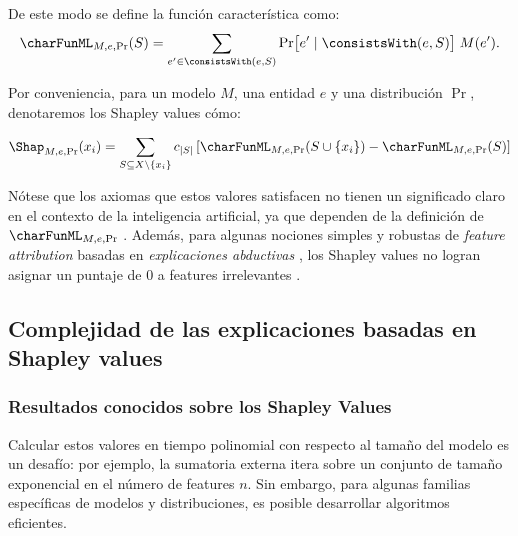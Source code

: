 
De este modo se define la función característica como:
\begin{align} \label{formula:characteristicFunctionDefinition}
    \charFunML_{M,e,\Pr}(S)
        = \sum_{e'\in\consistsWith(e,S)}
    \Pr\bigl[e'\mid\consistsWith(e,S)\bigr]\;M(e').    
\end{align}


Por conveniencia, para un modelo \(M\), una entidad \(e\) y una distribución \(\Pr\), denotaremos los Shapley values cómo:

\[
\Shap_{M,e,\Pr}(x_i) = \sum_{S \subseteq X \setminus \{x_i\}} c_{|S|} \left[ \charFunML_{M,e,\Pr}(S \cup \{x_i\}) - \charFunML_{M,e,\Pr}(S) \right]
\]



Nótese que los axiomas que estos valores satisfacen no tienen un significado claro en el contexto de la inteligencia artificial, ya que dependen de la definición de \(\charFunML_{M,e,\Pr}\) \cite{fryer2021shapley}. Además, para algunas nociones simples y robustas de \textit{feature attribution} basadas en \textit{explicaciones abductivas} \cite{marques2023logic}, los Shapley values no logran asignar un puntaje de 0 a features irrelevantes \cite{huang2023inadequacy}.

\subsection{Complejidad de las explicaciones basadas en Shapley values}

\subsubsection{Resultados conocidos sobre los Shapley Values}

Calcular estos valores en tiempo polinomial con respecto al tamaño del modelo es un desafío: por ejemplo, la sumatoria externa itera sobre un conjunto de tamaño exponencial en el número de features \(n\). Sin embargo, para algunas familias específicas de modelos y distribuciones, es posible desarrollar algoritmos eficientes.

